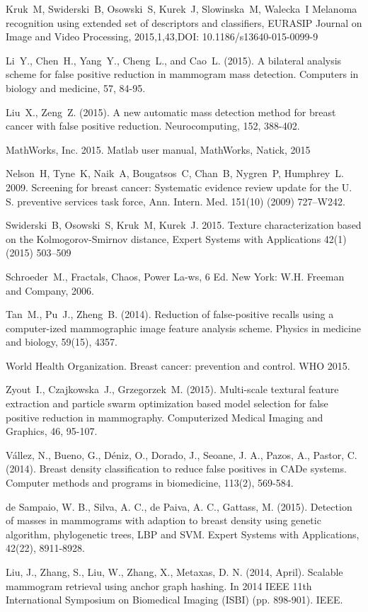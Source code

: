 \documentclass[review,12pt]{elsarticle}
\begin{document}
\begin{thebibliography}{1}
Kruk~M, Swiderski~B, Osowski~S, Kurek~J, Slowinska~M, Walecka~I
Melanoma recognition using extended set of descriptors and classifiers, EURASIP Journal on Image and Video Processing, 2015,1,43,DOI: 10.1186/s13640-015-0099-9

Li~Y., Chen~H., Yang~Y., Cheng~L., and Cao~L. (2015). A bilateral analysis scheme for false positive
reduction in mammogram mass detection. Computers in biology and medicine, 57, 84-95.

Liu~X., Zeng~Z. (2015). A new automatic mass detection method for breast cancer with false positive reduction. Neurocomputing, 152, 388-402.

MathWorks, Inc. 2015. Matlab user manual, MathWorks, Natick, 2015

Nelson~H, Tyne~K, Naik~A, Bougatsos~C, Chan~B, Nygren~P, Humphrey~L. 2009. Screening for breast cancer: Systematic evidence review update for the U. S. preventive services task force, Ann. Intern. Med. 151(10) (2009) 727–W242.

Swiderski~B, Osowski~S, Kruk~M, Kurek~J. 2015. Texture characterization based on the Kolmogorov-Smirnov distance, Expert Systems with Applications 42(1) (2015) 503–509

Schroeder~M., Fractals, Chaos, Power La-ws, 6 Ed. New York: W.H. Freeman and Company, 2006.

Tan~M., Pu~J., Zheng~B. (2014). Reduction of false-positive recalls using a computer-ized mammographic image feature analysis scheme. Physics in medicine and biology, 59(15), 4357.

World Health Organization. Breast cancer: prevention and control. WHO 2015.

Zyout~I., Czajkowska~J., Grzegorzek~M. (2015). Multi-scale textural feature extraction and particle swarm optimization based model selection for false positive reduction in mammography. Computerized Medical Imaging and Graphics, 46, 95-107.

Vállez, N., Bueno, G., Déniz, O., Dorado, J., Seoane, J. A., Pazos, A., Pastor, C. (2014). Breast density classification to reduce false positives in CADe systems. Computer methods and programs in biomedicine, 113(2), 569-584.

de Sampaio, W. B., Silva, A. C., de Paiva, A. C.,  Gattass, M. (2015). Detection of masses in mammograms with adaption to breast density using genetic algorithm, phylogenetic trees, LBP and SVM. Expert Systems with Applications, 42(22), 8911-8928.

Liu, J., Zhang, S., Liu, W., Zhang, X.,  Metaxas, D. N. (2014, April). Scalable mammogram retrieval using anchor graph hashing. In 2014 IEEE 11th International Symposium on Biomedical Imaging (ISBI) (pp. 898-901). IEEE.
\end{thebibliography}
\end{document}
